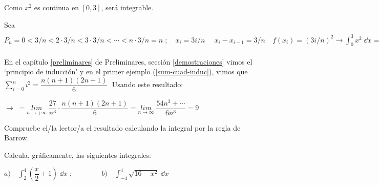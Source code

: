 \begin{proofw}\renewcommand{\qedsymbol}{$\diamond$}	

Como $x^2$ es continua en $[0,3]$, será integrable.

Sea $P_n=0<3/n<2\cdot 3/n<3 \cdot 3/n < \cdots < n\cdot 3/n=n \; ; \quad x_i=3i/n\;\quad x_i-x_{i-1}=3/n \quad f(x_i)= (3i/n)^2 \to \displaystyle \int_0^3 x^2 \; \dd x = \underset {n \to  +\infty}{lim }\; {\sum_{i=0}^{n} } {\left( \dfrac {3i}{n} \right)^2\cdot \dfrac {3}{n}} = \underset {n\to +\infty}{lim}\; { \dfrac {27} {n^3 } \sum_{i=0}^{n} {i^2} } = \; \to $ 

En el capítulo \ref{preliminares} de Preliminares, sección \ref{demostraciones} vimos el `principio de inducción' y en el primer ejemplo (\ref{sum-cuad-induc}), vimos que $\displaystyle \sum_{i=0}^n i^2= \dfrac {n(n+1)(2n+1)}{6}\;$ Usando este resultado:

$\displaystyle \to \; = \underset {n\to +\infty}{lim}\; { \dfrac {27} {n^3} \cdot \dfrac  {n(n+1)(2n+1)}{6} } =
\underset {n \to \infty}{lim}\; {\dfrac {54n^3+\cdots}{6n^3} } = 9$

\textcolor{gris}{Compruebe el/la lector/a el resultado calculando la integral por la regla de Barrow.} 
	
\end{proofw}

\vspace{6mm}

\begin{ejre}
Calcula, gráficamente, las siguientes integrales:

$a)\quad \displaystyle \int_2^4\left( \dfrac x 2 + 1\right)\; \dd x\; ; \qquad \qquad b) \quad \int_{-4}^4 \sqrt{16-x^2}\; \dd x$	
\end{ejre}

